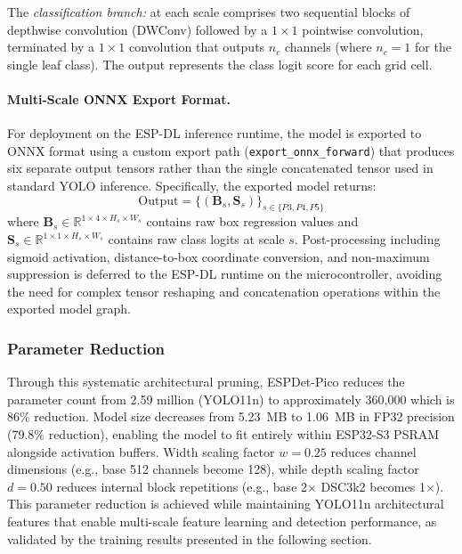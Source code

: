 The \textit{classification branch:} at each scale comprises two sequential blocks of depthwise convolution (DWConv) followed by a $1 \times 1$ pointwise convolution, terminated by a $1 \times 1$ convolution that outputs $n_c$ channels (where $n_c = 1$ for the single leaf class). The output represents the class logit score for each grid cell.


\paragraph{Multi-Scale ONNX Export Format.}
For deployment on the ESP-DL inference runtime, the model is exported to ONNX format using a custom export path (\texttt{export\_onnx\_forward}) that produces six separate output tensors rather than the single concatenated tensor used in standard YOLO inference. Specifically, the exported model returns:
\begin{equation}
\text{Output} = \{(\mathbf{B}_s, \mathbf{S}_s)\}_{s \in \{P3, P4, P5\}}
\end{equation}
where $\mathbf{B}_s \in \mathbb{R}^{1 \times 4 \times H_s \times W_s}$ contains raw box regression values and $\mathbf{S}_s \in \mathbb{R}^{1 \times 1 \times H_s \times W_s}$ contains raw class logits at scale $s$. Post-processing including sigmoid activation, distance-to-box coordinate conversion, and non-maximum suppression is deferred to the ESP-DL runtime on the microcontroller, avoiding the need for complex tensor reshaping and concatenation operations within the exported model graph.

\subsubsection{Parameter Reduction}

Through this systematic architectural pruning, ESPDet-Pico reduces the parameter count from 2.59 million (YOLO11n) to approximately 360,000 which is 86\% reduction. Model size decreases from 5.23~MB to 1.06~MB in FP32 precision (79.8\% reduction), enabling the model to fit entirely within ESP32-S3 PSRAM alongside activation buffers. Width scaling factor $w=0.25$ reduces channel dimensions (e.g., base 512 channels become 128), while depth scaling factor $d=0.50$ reduces internal block repetitions (e.g., base 2$\times$ DSC3k2 becomes 1$\times$). This parameter reduction is achieved while maintaining YOLO11n architectural features that enable multi-scale feature learning and detection performance, as validated by the training results presented in the following section.

